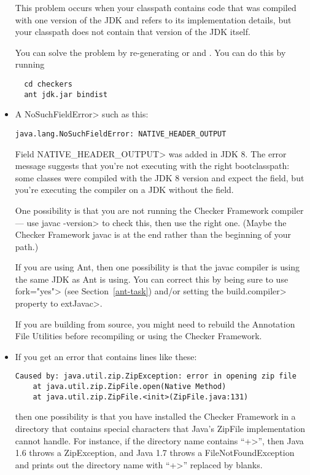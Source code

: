 \begin{itemize}
This problem occurs when your classpath contains code that was compiled
with one version of the JDK and refers to its implementation details, but
your classpath does not contain that version of the JDK itself.

You can solve the problem by re-generating 
or  and .
You can do this by running

\begin{Verbatim}
  cd checkers
  ant jdk.jar bindist
\end{Verbatim}


\item
A \<NoSuchFieldError> such as this:

\begin{Verbatim}
java.lang.NoSuchFieldError: NATIVE_HEADER_OUTPUT
\end{Verbatim}

\noindent
Field \<NATIVE\_HEADER\_OUTPUT> was added in JDK 8.
The error message suggests that
you're not executing with the right bootclasspath: some classes were
compiled with the JDK 8 version and expect the field, but you're
executing the compiler on a JDK without the field.

One possibility is that you are not running the Checker Framework compiler
--- use \<javac -version> to check this, then use the right one.  (Maybe
the Checker Framework javac is at the end rather than the beginning of your
path.)

If you are using Ant, then one possibility
is that the javac compiler is using the same JDK as Ant is using.  You can
correct this by being sure to use \<fork="yes"> (see
Section~\ref{ant-task}) and/or setting the \<build.compiler> property to
\<extJavac>.

If you are building from source, you might need to rebuild the Annotation
File Utilities before recompiling or using the Checker Framework.


\item
If you get an error that contains lines like these:

\begin{Verbatim}
Caused by: java.util.zip.ZipException: error in opening zip file
	at java.util.zip.ZipFile.open(Native Method)
	at java.util.zip.ZipFile.<init>(ZipFile.java:131)
\end{Verbatim}

\noindent
then one possibility is that you have installed the Checker Framework in a
directory that contains special characters that Java's ZipFile
implementation cannot handle.  For instance, if the directory name contains
``\<+>'', then Java 1.6 throws a ZipException, and Java 1.7 throws a
FileNotFoundException and prints out the directory name with ``\<+>''
replaced by blanks.

\end{itemize}


